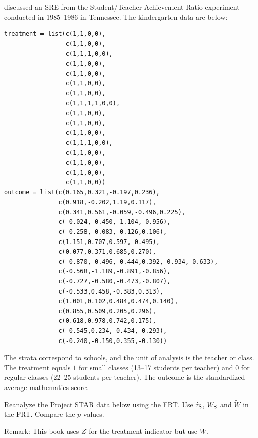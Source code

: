 \begin{HomeworkProblem}\label{exr:5-7}


\citet{imbens2015causal} discussed an SRE from the Student/Teacher Achievement Ratio experiment conducted in 1985--1986 in Tennessee.
The kindergarten data are below:
 \begin{lstlisting}
treatment = list(c(1,1,0,0),
                 c(1,1,0,0),
                 c(1,1,1,0,0),
                 c(1,1,0,0),
                 c(1,1,0,0),
                 c(1,1,0,0),
                 c(1,1,0,0),
                 c(1,1,1,1,0,0),
                 c(1,1,0,0),
                 c(1,1,0,0),
                 c(1,1,0,0),
                 c(1,1,1,0,0),
                 c(1,1,0,0),
                 c(1,1,0,0),
                 c(1,1,0,0),
                 c(1,1,0,0))
outcome = list(c(0.165,0.321,-0.197,0.236),
               c(0.918,-0.202,1.19,0.117),
               c(0.341,0.561,-0.059,-0.496,0.225),
               c(-0.024,-0.450,-1.104,-0.956),
               c(-0.258,-0.083,-0.126,0.106),
               c(1.151,0.707,0.597,-0.495),
               c(0.077,0.371,0.685,0.270),
               c(-0.870,-0.496,-0.444,0.392,-0.934,-0.633),
               c(-0.568,-1.189,-0.891,-0.856),
               c(-0.727,-0.580,-0.473,-0.807),
               c(-0.533,0.458,-0.383,0.313),
               c(1.001,0.102,0.484,0.474,0.140),
               c(0.855,0.509,0.205,0.296),
               c(0.618,0.978,0.742,0.175),
               c(-0.545,0.234,-0.434,-0.293),
               c(-0.240,-0.150,0.355,-0.130))
\end{lstlisting}
The strata correspond to schools, and the unit of analysis is the teacher or class. The treatment equals $1$ for small classes (13--17 students per teacher) and $0$ for regular classes (22--25 students per teacher). The outcome is the standardized average mathematics score.


Reanalyze the Project STAR data below using the FRT.  Use $\hat{\tau}_\textsc{S}$, $W_\textsc{S}$ and $\tilde W$ in the FRT. Compare the $p$-values.

Remark: This book uses $Z$ for the treatment indicator but \citet{imbens2015causal} use $W.$







\end{HomeworkProblem}


